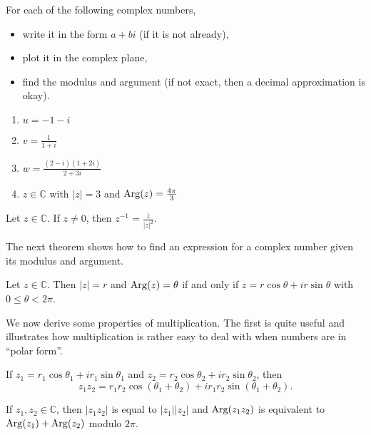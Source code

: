 \begin{problem}\label{prob.ComplexCheckin}
For each of the following complex numbers,
\begin{itemize}
\item write it in the form $a+bi$ (if it is not already),
\item plot it in the complex plane,
\item find the modulus and argument (if not exact, then a decimal approximation is okay).
\end{itemize}
\begin{multicols}{2}
\begin{enumerate}
\item $u = -1-i$
\item $v= \frac{1}{1+i}$
\item $w = \frac{(2-i)(1+2i)}{2+3i}$
\item $z\in \mathbb{C}$ with $|z| = 3$ and $\operatorname{Arg}(z) = \frac{4\pi}{3}$
\end{enumerate}
\end{multicols}
\end{problem}

\begin{theorem}
Let $z\in \mathbb{C}$. If $z\neq 0$, then $z^{-1} = \displaystyle\frac{\overline{z}}{|z|^2}$.
\end{theorem}

The next theorem shows how to find an expression for a complex number given its modulus and argument.
 
\begin{theorem}\label{thm.PolarToRectangular}
Let $z\in \mathbb{C}$. Then $|z| = r$ and $\operatorname{Arg}(z) = \theta$ if and only if $z = r\cos\theta + ir\sin\theta$ with $0\le \theta <2\pi$.
\end{theorem}

We now derive some properties of multiplication. The first is quite useful and illustrates how multiplication is rather easy to deal with when numbers are in ``polar form''.

\begin{theorem}\label{thm.MultiplyComplex}
If $z_1 = r_1\cos\theta_1 + ir_1\sin\theta_1$ and $z_2=r_2\cos\theta_2 + ir_2\sin\theta_2$, then \[z_1z_2 = r_1r_2\cos(\theta_1+\theta_2) + ir_1r_2\sin(\theta_1+\theta_2).\]
\end{theorem}

\begin{corollary}
If $z_1,z_2\in \mathbb{C}$, then $|z_1z_2|$ is equal to $|z_1||z_2|$ and $\operatorname{Arg}(z_1z_2)$ is equivalent to $\operatorname{Arg}(z_1)+\operatorname{Arg}(z_2)$ modulo $2\pi$.
\end{corollary}

